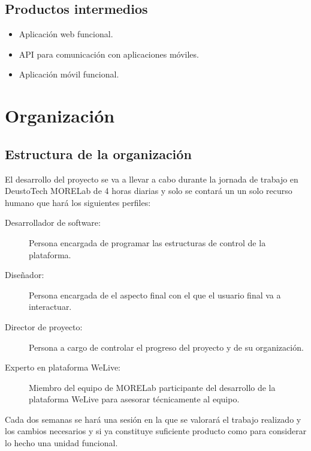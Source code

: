 \documentclass{DeustoFDP}
\begin{document}
\subsection{Productos intermedios}
\begin{itemize}
  \item Aplicación web funcional.
  \item API para comunicación con aplicaciones móviles.
  \item Aplicación móvil funcional.
\end{itemize}

\section{Organización}
\subsection{Estructura de la organización}
El desarrollo del proyecto se va a llevar a cabo durante la jornada de trabajo en DeustoTech MORELab de 4 horas diarias y solo se contará un un solo recurso humano que hará los siguientes perfiles:

\begin{description}
    \item[Desarrollador de software:] Persona encargada de programar las estructuras de control de la plataforma.
    \item[Diseñador:] Persona encargada de el aspecto final con el que el usuario final va a interactuar.
    \item[Director de proyecto:] Persona a cargo de controlar el progreso del proyecto y de su organización.
    \item[Experto en plataforma WeLive:] Miembro del equipo de MORELab participante del desarrollo de la plataforma WeLive para asesorar técnicamente al equipo.
\end{description}

Cada dos semanas se hará una sesión en la que se valorará el trabajo realizado y los cambios necesarios y si ya constituye suficiente producto como para considerar lo hecho una unidad funcional.

\printbibliography[heading=bibintoc]

\appendix

\backmatter
\end{document}
